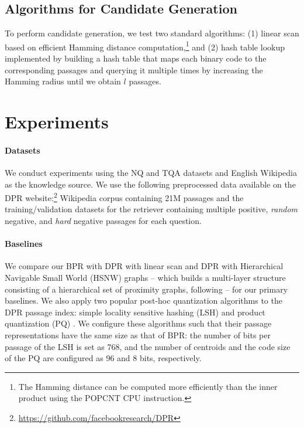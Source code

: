 \documentclass[11pt,a4paper]{article}
\begin{document}
\subsection{Algorithms for Candidate Generation}
\label{subsec:inference}
To perform candidate generation, we test two standard algorithms: (1) linear scan based on efficient Hamming distance computation,\footnote{The Hamming distance can be computed more efficiently than the inner product using the POPCNT CPU instruction.} and (2) hash table lookup implemented by building a hash table that maps each binary code to the corresponding passages and querying it multiple times by increasing the Hamming radius until we obtain $l$ passages.

\section{Experiments}

\paragraph{Datasets}
We conduct experiments using the NQ and TQA datasets and English Wikipedia as the knowledge source.
We use the following preprocessed data available on the DPR website:\footnote{\url{https://github.com/facebookresearch/DPR}} Wikipedia corpus containing 21M passages and the training/validation datasets for the retriever containing multiple positive, \textit{random} negative, and \textit{hard} negative passages for each question.

\paragraph{Baselines}
We compare our BPR with DPR with linear scan and DPR with Hierarchical Navigable Small World (HSNW) graphs \cite{Malkov2020EfficientGraphs} -- which builds a multi-layer structure consisting of a hierarchical set of proximity graphs, following \citet{Karpukhin2020DenseAnswering} -- for our primary baselines.
We also apply two popular post-hoc quantization algorithms to the DPR passage index: simple locality sensitive hashing (LSH) \cite{Neyshabur2015OnSearch} and product quantization (PQ) \cite{Jegou2011ProductSearch}.
We configure these algorithms such that their passage representations have the same size as that of BPR: the number of bits per passage of the LSH is set as 768, and the number of centroids and the code size of the PQ are configured as 96 and 8 bits, respectively.
\end{document}
